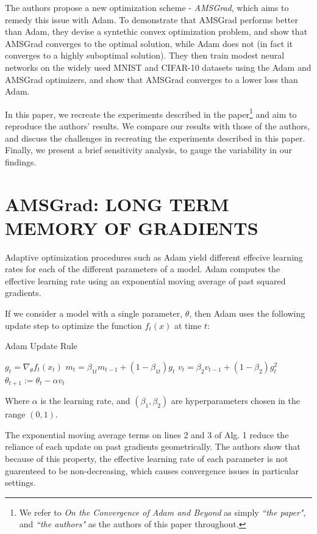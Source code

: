 \documentclass[letterpaper, 10 pt, conference]{ieeeconf}  %
\begin{document}
The authors propose a new optimization scheme - \emph{AMSGrad}, which aims to remedy this issue with Adam. To demonstrate that AMSGrad performs better than Adam, they devise a syntethic convex optimization problem, and show that AMSGrad converges to the optimal solution, while Adam does not (in fact it converges to a highly suboptimal solution). They then train modest neural networks on the widely used MNIST and CIFAR-10 datasets using the Adam and AMSGrad optimizers, and show that AMSGrad converges to a lower loss than Adam. 

In this paper, we recreate the experiments described in the paper\footnote{We refer to \emph{On the Convergence of Adam and Beyond} as simply \emph{``the paper"}, and \emph{``the authors"} as the authors of this paper throughout.} and aim to reproduce the authors' results. We compare our results with those of the authors, and discuss the challenges in recreating the experiments described in this paper. Finally, we present a brief sensitivity analysis, to gauge the variability in our findings.

\section{AMSGrad: LONG TERM MEMORY OF GRADIENTS}

Adaptive optimization procedures such as Adam yield different effecive learning rates for each of the different parameters of a model. Adam computes the effective learning rate using an exponential moving average of past squared gradients. 

If we consider a model with a single parameter, $\theta$, then Adam uses the following update step to optimize the function $f_{t}(x)$ at time $t$:

\begin{algorithm}
\caption{Adam Update Rule}\label{Adam-update}
\begin{algorithmic}[1]
\State $g_t = \nabla_{\theta}f_t(x_t)$
\State $m_t = \beta_{1t}m_{t-1} + (1 - \beta_{1t})g_t$ 
\State $v_t = \beta_2{v_{t-1}} + (1-\beta_2)g_t^2$
\State $\theta_{t + 1} := \theta_t - \alpha{v_t}$
\end{algorithmic}
\end{algorithm}
Where $\alpha$ is the learning rate, and $(\beta_1, \beta_2)$ are hyperparameters chosen in the range $(0,1)$.

The exponential moving average terms on lines 2 and 3 of Alg. 1 reduce the reliance of each update on past gradients geometrically. The authors show that because of this property, the effective learning rate of each parameter is not guarenteed to be non-decreasing, which causes convergence issues in particular settings. 
\end{document}
